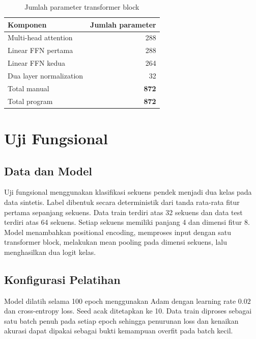 \documentclass[12pt,a4paper]{article}
\begin{document}
\begin{table}[H]
    \centering
    \caption{Jumlah parameter transformer block}
    \label{tab:block-parameters}
    \renewcommand{\arraystretch}{1.2}
    \begin{tabular}{l r}
        \toprule
        Komponen & Jumlah parameter \\
        \midrule
        Multi-head attention & 288 \\
        Linear FFN pertama & 288 \\
        Linear FFN kedua & 264 \\
        Dua layer normalization & 32 \\
        \midrule
        Total manual & \textbf{872} \\
        Total program & \textbf{872} \\
        \bottomrule
    \end{tabular}
\end{table}

\section{Uji Fungsional}

\subsection{Data dan Model}
Uji fungsional menggunakan klasifikasi sekuens pendek menjadi dua kelas pada
data sintetis. Label dibentuk secara deterministik dari tanda rata-rata fitur
pertama sepanjang sekuens.
Data train terdiri atas 32 sekuens dan data test terdiri atas 64 sekuens.
Setiap sekuens memiliki panjang 4 dan dimensi fitur 8. Model menambahkan
positional encoding, memproses input dengan satu transformer block, melakukan
mean pooling pada dimensi sekuens, lalu menghasilkan dua logit kelas.

\subsection{Konfigurasi Pelatihan}
Model dilatih selama 100 epoch menggunakan Adam dengan learning rate $0.02$
dan cross-entropy loss. Seed acak ditetapkan ke 10. Data train diproses
sebagai satu batch penuh pada setiap epoch sehingga penurunan loss dan
kenaikan akurasi dapat dipakai sebagai bukti kemampuan overfit pada batch
kecil.
\end{document}

